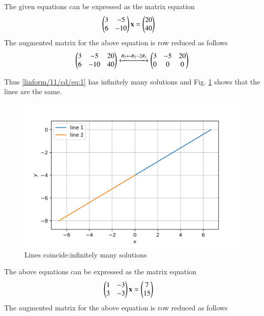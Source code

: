     \item The given  equations can be expressed as the matrix equation
    \begin{align}
\label{linform/11/cd/eq:1}
  \begin{pmatrix}3&-5\\6&-10\end{pmatrix}\mathbf{x} &= \begin{pmatrix}20\\40\end{pmatrix}
\end{align}
The augmented matrix for the above equation
is row reduced as follows
\begin{align}
    \begin{pmatrix}3&-5&20\\6&-10&40\end{pmatrix}\xleftrightarrow{R_2\leftarrow R_2 -2R_1}\begin{pmatrix}3&-5&20\\0&0&0\end{pmatrix} \label{linform/11/cd/eq:(2)}
\end{align}

Thus  \ref{linform/11/cd/eq:1} has infinitely many solutions and 
Fig. \ref{linform/11/cd/fig:1} shows that the lines are the same.
\begin{figure}[!ht]
    \centering
    \includegraphics[width= \columnwidth]{solutions/su2021/2/11/cd/assignment2c-1.png}
    \caption{Lines coincide:infinitely many solutions}
    \label{linform/11/cd/fig:1}
\end{figure}
\item 
    The above equations can be expressed as the  matrix equation
    \begin{align}
\label{linform/11/cd/eq:7}
  \begin{pmatrix}1&-3\\3&-3\end{pmatrix}\mathbf{x} &= \begin{pmatrix}7\\15\end{pmatrix}
\end{align}
The augmented matrix for the above equation
is row reduced as follows
